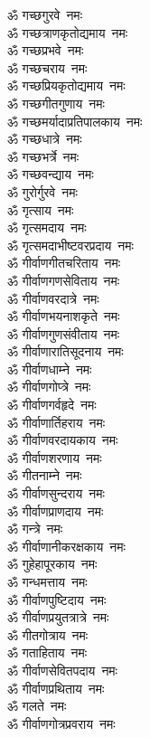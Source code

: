\begin{multicols}{2}
\begin{flushleft}
ॐ गच्छगुरवे~नमः\\
ॐ गच्छत्राणकृतोद्यमाय~नमः\hfill{}\\
ॐ गच्छप्रभवे~नमः\\
ॐ गच्छचराय~नमः\\
ॐ गच्छप्रियकृतोद्यमाय~नमः\\
ॐ गच्छगीतगुणाय~नमः\\
ॐ गच्छमर्यादाप्रतिपालकाय~नमः\\
ॐ गच्छधात्रे~नमः\\
ॐ गच्छभर्त्रे~नमः\\
ॐ गच्छवन्द्याय~नमः\\
ॐ गुरोर्गुरवे~नमः\\
ॐ गृत्साय~नमः\hfill{}\\
ॐ गृत्समदाय~नमः\\
ॐ गृत्समदाभीष्टवरप्रदाय~नमः\\
ॐ गीर्वाणगीतचरिताय~नमः\\
ॐ गीर्वाणगणसेविताय~नमः\\
ॐ गीर्वाणवरदात्रे~नमः\\
ॐ गीर्वाणभयनाशकृते~नमः\\
ॐ गीर्वाणगुणसंवीताय~नमः\\
ॐ गीर्वाणारातिसूदनाय~नमः\\
ॐ गीर्वाणधाम्ने~नमः\\
ॐ गीर्वाणगोप्त्रे~नमः\hfill{}\\
ॐ गीर्वाणगर्वहृदे~नमः\\
ॐ गीर्वाणार्तिहराय~नमः\\
ॐ गीर्वाणवरदायकाय~नमः\\
ॐ गीर्वाणशरणाय~नमः\\
ॐ गीतनाम्ने~नमः\\
ॐ गीर्वाणसुन्दराय~नमः\\
ॐ गीर्वाणप्राणदाय~नमः\\
ॐ गन्त्रे~नमः\\
ॐ गीर्वाणानीकरक्षकाय~नमः\\
ॐ गुहेहापूरकाय~नमः\hfill{}\\
ॐ गन्धमत्ताय~नमः\\
ॐ गीर्वाणपुष्टिदाय~नमः\\
ॐ गीर्वाणप्रयुतत्रात्रे~नमः\\
ॐ गीतगोत्राय~नमः\\
ॐ गताहिताय~नमः\\
ॐ गीर्वाणसेवितपदाय~नमः\\
ॐ गीर्वाणप्रथिताय~नमः\\
ॐ गलते~नमः\\
ॐ गीर्वाणगोत्रप्रवराय~नमः\\

\end{flushleft}
\end{multicols}
